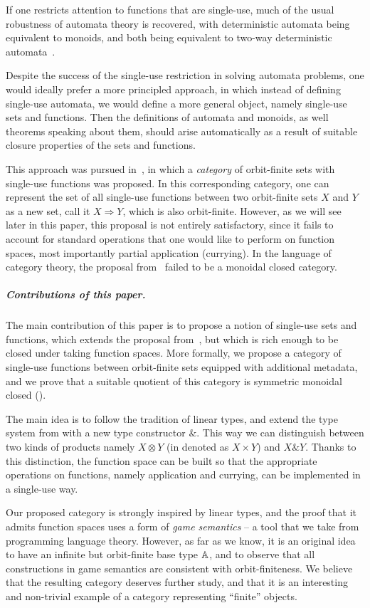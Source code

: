\documentclass[a4paper,UKenglish,cleveref, autoref, numberwithinsect, thm-restate]{lipics-v2021}
\begin{document}
If one restricts attention to functions that are single-use, much of the usual robustness of automata theory is recovered, with deterministic automata being equivalent to monoids, and both being equivalent to two-way deterministic automata~\cite{bojanczykstefanski2020}.

Despite the success of the single-use restriction in solving automata problems, one would ideally prefer a more principled approach, in which instead of defining single-use automata, we would define a more general object, namely single-use sets and functions. Then the definitions of  automata and monoids, as well theorems speaking about them, should arise automatically as a result of suitable closure properties of the sets and functions.

This approach was pursued in~\cite{stefanski-phd}, in which a \emph{category} of orbit-finite sets with single-use functions was proposed. In this corresponding category,  one can represent the set of all single-use functions between two orbit-finite sets $X$ and $Y$ as a new set, call it $X \Rightarrow Y$, which is  also orbit-finite.  However, as we will see later in this paper, this proposal is not entirely satisfactory, since it fails to account for standard operations that one would like to perform on function spaces, most importantly partial application (currying). In the language of category theory, the proposal from~\cite{stefanski-phd} failed to be a monoidal closed category.


 \subparagraph{Contributions of this paper.}
 The main contribution of this paper is to propose a notion of single-use sets and functions, which extends the proposal from~\cite{stefanski-phd}, but which is rich enough to be closed under taking function spaces. More formally, we propose a category of single-use functions between orbit-finite sets equipped with additional metadata, and we prove that a suitable quotient of this category is symmetric monoidal closed ().


The main idea is to follow the tradition of linear types, and extend the type system from \cite{stefanski-phd} with a new type constructor $\&$. This way we can distinguish between two kinds of products
namely $X \otimes Y$ (in \cite{stefanski-phd} denoted as $X \times Y$) and $X \& Y$. Thanks to this distinction, the function space can be built so that the appropriate operations on functions, namely application and currying, can be implemented in a single-use way.

Our proposed category is strongly inspired by linear types, and the proof that it admits function spaces uses a form of \emph{game semantics} -- a tool that we take from programming language theory. However, as far as we know, it is an original idea to have an infinite but orbit-finite base type $\mathbb A$, and to observe that all constructions in game semantics are consistent with orbit-finiteness. We believe that the resulting category deserves further study, and that it is an interesting and non-trivial example of a category representing ``finite'' objects.
\end{document}

